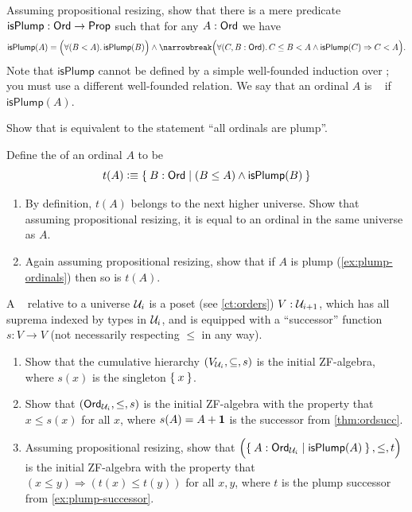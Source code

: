 \begin{ex}\label{ex:plump-ordinals}
  Assuming propositional resizing, show that there is a mere predicate $\mathsf{isPlump}:\mathsf{Ord}\to\mathsf{Prop}$ such that for any $A:\mathsf{Ord}$ we have
  \begin{multline*}\label{eq:plump}
    \mathsf{isPlump}(A) = \Parens{\fall{B<A} \mathsf{isPlump}(B)} \wedge\narrowbreak
    \Parens{\fall{C,B:\ord} C\le B < A \wedge \mathsf{isPlump}(C) \Rightarrow C < A}.
  \end{multline*}
  Note that $\mathsf{isPlump}$ cannot be defined by a simple well-founded induction over \ord; you must use a different well-founded relation.
  We say that an ordinal $A$ is ~\cite{taylor:ordinals,Taylor99} if $\mathsf{isPlump}(A)$.
\end{ex}

\begin{ex}\label{ex:not-plump}
  Show that \LEM{} is equivalent to the statement ``all ordinals are plump''.
\end{ex}

\begin{ex}\label{ex:plump-successor}
  Define the  of an ordinal $A$ to be
  \[ t(A) \defeq \setof{ B:\ord | (B\le A) \wedge \mathsf{isPlump}(B) } \]
  \begin{enumerate}
  \item By definition, $t(A)$ belongs to the next higher universe.
    Show that assuming propositional resizing, it is equal to an ordinal in the same universe as $A$.
  \item Again assuming propositional resizing, show that if $A$ is plump (\cref{ex:plump-ordinals}) then so is $t(A)$.
  \end{enumerate}
\end{ex}

\begin{ex}\label{ex:ZF-algebras}
  A ~\cite{JoyalMoerdijk1995}
  relative to a universe $\mathcal{U}_i$ is a poset (see \cref{ct:orders}) $V:\mathcal{U}_{i+1}$, which has all suprema indexed by types in $\mathcal{U}_i$, and is equipped with a ``successor'' function $s:V\to V$ (not necessarily respecting $\le$ in any way).
  \begin{enumerate}
  \item Show that the cumulative hierarchy $(V_{\mathcal{U}_i},\subseteq,s)$ is the initial ZF-algebra, where $s(x)$ is the singleton $\Set{x}$.
  \item Show that $(\mathsf{Ord}_{\mathcal{U}_i},\le,s)$ is the initial ZF-algebra with the property that $x\le s(x)$ for all $x$, where $s(A)=A+\mathbf{1}$ is the successor from \cref{thm:ordsucc}.
  \item Assuming propositional resizing, show that $\Parens{\setof{A:\ord_{\UU_i} | \mathsf{isPlump}(A) },\le,t}$ is the initial ZF-algebra with the property that $(x\le y) \Rightarrow (t(x)\le t(y))$ for all $x,y$, where $t$ is the plump successor from \cref{ex:plump-successor}.
  \end{enumerate}
\end{ex}

